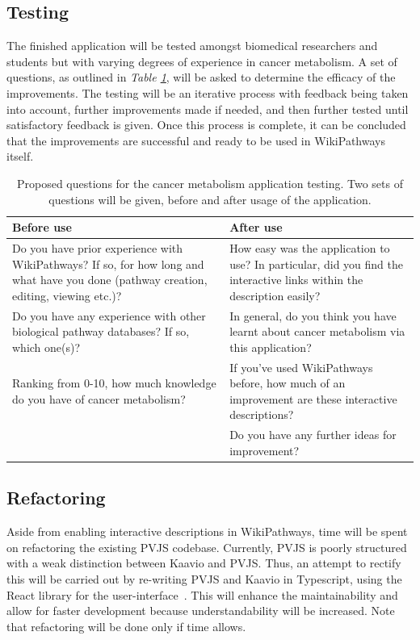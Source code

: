 \documentclass[a4paper,12pt,twoside]{apa}
\begin{document}
\FloatBarrier
\subsection{Testing}
The finished application will be tested amongst biomedical researchers and students but with varying degrees of experience in cancer metabolism. A set of questions, as outlined in \textit{Table \ref{tbl:test-questions}}, will be asked to determine the efficacy of the improvements. The testing will be an iterative process with feedback being taken into account, further improvements made if needed, and then further tested until satisfactory feedback is given. Once this process is complete, it can be concluded that the improvements are successful and ready to be used in WikiPathways itself.

\begin{table}[h]
  \centering
  \caption{Proposed questions for the cancer metabolism application testing. Two sets of questions will be given, before and after usage of the application.}
  \label{tbl:test-questions}
    \begin{tabularx}{0.9\textwidth}{|X|X|}
      \hline
      \textbf{Before use}
      &
      \textbf{After use}
      \\ \hline
      Do you have prior experience with WikiPathways? If so, for how long and what have you done (pathway creation, editing, viewing etc.)?
      &
      How easy was the application to use? In particular, did you find the interactive links within the description easily?
      \\ \hline
      Do you have any experience with other biological pathway databases? If so, which one(s)?
      &
      In general, do you think you have learnt about cancer metabolism via this application?
      \\ \hline
      Ranking from 0-10, how much knowledge do you have of cancer metabolism?
      &
      If you've used WikiPathways before, how much of an improvement are these interactive descriptions?
      \\ \hline
      &
      Do you have any further ideas for improvement?
      \\ \hline

    \end{tabularx}
\end{table}

\FloatBarrier
\subsection{Refactoring}
Aside from enabling interactive descriptions in WikiPathways, time will be spent on refactoring the existing PVJS codebase. Currently, PVJS is poorly structured with a weak distinction between Kaavio and PVJS. Thus, an attempt to rectify this will be carried out by re-writing PVJS and Kaavio in Typescript, using the React library for the user-interface~\cite{React, Typescript}. This will enhance the maintainability and allow for faster development because understandability will be increased. Note that refactoring will be done only if time allows.
\end{document}
